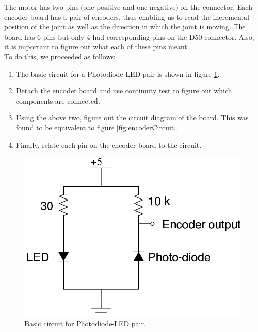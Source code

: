 \documentclass[10pt,a4paper]{article}
\begin{document}
The motor has two pins (one positive and one negative) on the
connector. Each encoder board has a pair of encoders, thus enabling us
to read the incremental position of the joint as well as the direction
in which the joint is moving. The board has 6 pins but only 4 had
corresponding pins on the D50 connector. Also, it is important to
figure out what each of these pins meant.\\

To do this, we proceeded as follows:
\begin{enumerate}
\item The basic circuit for a Photodiode-LED pair is shown in figure
  \ref{fig:photodiodeLEDPair}. 
\item Detach the encoder board and use continuity test to figure out
  which components are connected.
\item Using the above two, figure out the circuit diagram of the
  board. This was found to be equivalent to figure
  \ref{fig:encoderCircuit}. 
\item Finally, relate each pin on the encoder board to the circuit.
\end{enumerate}

\begin{figure}[h]
    \centering
    \includegraphics[scale=0.5]{SimpleEncoder.jpg}
    \caption{Basic circuit for Photodiode-LED pair.}
    \label{fig:photodiodeLEDPair}
\end{figure}
\end{document}
